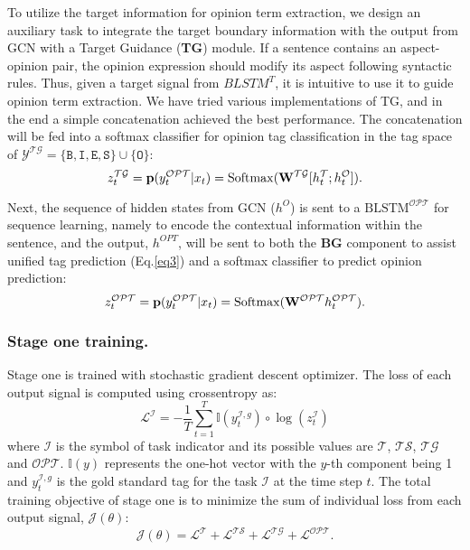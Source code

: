 \documentclass[letterpaper]{article} \usepackage{aaai20}  \usepackage{times}  \usepackage{helvet} \usepackage{courier}  \usepackage[hyphens]{url}  \usepackage{graphicx} \urlstyle{rm} \def\UrlFont{\rm}  \usepackage{graphicx}  \frenchspacing  \setlength{\pdfpagewidth}{8.5in}  \setlength{\pdfpageheight}{11in}
\begin{document}
To utilize the target information for opinion term extraction, we design an auxiliary task to integrate the target boundary information with the output from GCN with a Target Guidance (\textbf{TG}) module. If a sentence contains an aspect-opinion pair, the opinion expression should modify its aspect following syntactic rules. Thus, given a target signal from $BLSTM^{T}$, it is intuitive to use it to guide opinion term extraction. We have tried various implementations of TG, and in the end a simple concatenation achieved the best performance. The concatenation will be fed into a softmax classifier for opinion tag classification in the tag space of $\mathcal{Y}^{\mathcal{TG}} = \{\texttt{B},\texttt{I},\texttt{E},\texttt{S} \} \cup \{\texttt{O}\}$:
\begin{equation}
    z^{\mathcal{TG}}_t = {\bf p}(y^{\mathcal{OPT}}_t|x_t) = \mathrm{Softmax}(\mathrm{\bf W}^{\mathcal{TG}} [h^{\mathcal{T}}_t;h^{\mathcal{O}}_t]).
\end{equation}

Next, the sequence of hidden states from GCN ($h^{O}$) is sent to a $\text{BLSTM}^{\mathcal{OPT}}$ for sequence learning, namely to encode the contextual information within the sentence, and the output, $h^{OPT}$, will be sent to both the \textbf{BG} component to assist unified tag prediction (Eq.\ref{eq3}) and a softmax classifier to predict opinion prediction:
\begin{equation}
    z^{\mathcal{OPT}}_t = {\bf p}(y^{\mathcal{OPT}}_t|x_t) = \mathrm{Softmax}(\mathrm{\bf W}^{\mathcal{OPT}} h^{\mathcal{OPT}}_t).
\end{equation}

\subsubsection{Stage one training.}
Stage one is trained with stochastic gradient descent optimizer. The loss of each output signal is computed using crossentropy as:
\begin{equation}
    \mathcal{L}^{\mathcal{I}} = -\frac{1}{T} \sum^{T}_{t=1} \mathbb{I}(y^{\mathcal{I},g}_t) \circ \log(z^{\mathcal{I}}_t)
\end{equation}
where $\mathcal{I}$ is the symbol of task indicator and its possible values are $\mathcal{T}$, $\mathcal{TS}$, $\mathcal{TG}$ and $\mathcal{OPT}$. $\mathbb{I}(y)$ represents the one-hot vector with the $y$-th component being 1 and $y^{\mathcal{I},g}_t$ is the gold standard tag for the task $\mathcal{I}$ at the time step $t$. The total training objective of stage one is to minimize the sum of individual loss from each output signal, $\mathcal{J}(\theta)$:
\begin{equation}
    \mathcal{J}(\theta) = \mathcal{L}^{\mathcal{T}} + \mathcal{L}^{\mathcal{TS}} + \mathcal{L}^{\mathcal{TG}}+ \mathcal{L}^{\mathcal{OPT}}.
\end{equation}
\end{document}
